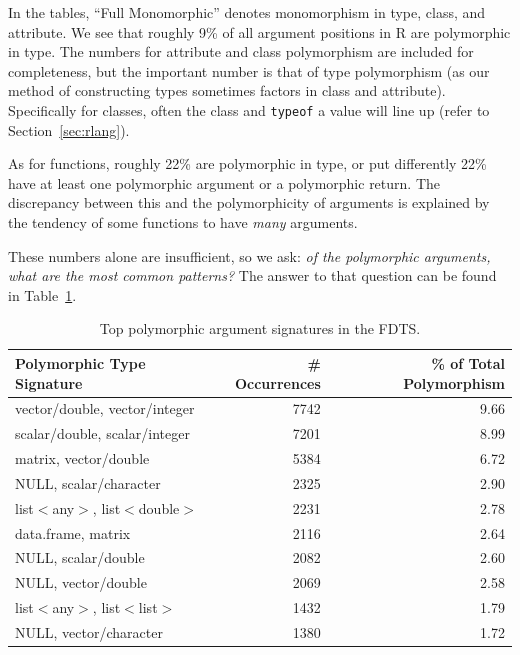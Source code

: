 \documentclass[acmsmall,10pt,review,anonymous]{acmart}\settopmatter{printfolios=true,printccs=false,printacmref=false}
\newcommand{\code}[1]{\lstinline|#1|\xspace}
\begin{document}

In the tables, ``Full Monomorphic'' denotes monomorphism in type, class, and attribute.
We see that roughly 9\% of all argument positions in R are polymorphic in type.
The numbers for attribute and class polymorphism are included for
completeness, but the important number is that of type polymorphism (as our
method of constructing types sometimes factors in class and attribute).
Specifically for classes, often the class and \code{typeof} a value will
line up (refer to Section~\ref{sec:rlang}).

As for functions, roughly 22\% are polymorphic in type, or put differently 22\% have at least one polymorphic argument or a polymorphic return.
The discrepancy between this and the polymorphicity of arguments is explained by the tendency of some functions to have {\it many} arguments.

These numbers alone are insufficient, so we ask: {\it of the polymorphic arguments, what are the most common patterns?}
The answer to that question can be found in Table~\ref{tab:toppolyFDTS}.

\begin{table}[ht]
\label{tab:toppolyFDTS}
\centering
\begin{tabular}{lrr}
  \hline
 Polymorphic Type Signature & \# Occurrences & \% of Total Polymorphism \\ 
  \hline
  vector/double, vector/integer & 7742 & 9.66 \\ 
  scalar/double, scalar/integer & 7201 & 8.99 \\ 
  matrix, vector/double & 5384 & 6.72 \\ 
  NULL, scalar/character & 2325 & 2.90 \\ 
  list$<$any$>$, list$<$double$>$ & 2231 & 2.78 \\ 
  data.frame, matrix & 2116 & 2.64 \\ 
  NULL, scalar/double & 2082 & 2.60 \\ 
  NULL, vector/double & 2069 & 2.58 \\ 
  list$<$any$>$, list$<$list$>$ & 1432 & 1.79 \\ 
  NULL, vector/character & 1380 & 1.72 \\
     \hline
\end{tabular}
\caption{Top polymorphic argument signatures in the FDTS.}
\end{table}
\end{document}
